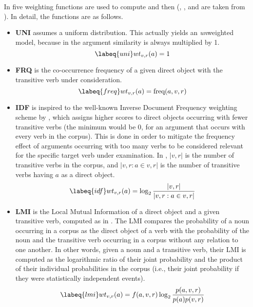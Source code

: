 In \textcite{CappelliLenciPISA} five weighting functions are used to compute  and then  (, , and  are taken from \textcite{ErkEtAl2010}). In detail, the functions are as follows.
\begin{itemize}

\item \textbf{UNI} assumes a uniform distribution. This actually yields an \textit{un}weighted model, because in  the argument similarity is always multiplied by 1.
\begin{equation} \labeq{uni}
wt_{v,r}(a) = 1
\end{equation}

\item \textbf{FRQ} is the co-occurrence frequency of a given direct object with the transitive verb under consideration.
\begin{equation} \labeq{freq}
wt_{v,r}(a) = \textrm{freq}(a,v,r)
\end{equation}

\item \textbf{IDF} is inspired to the well-known Inverse Document Frequency weighting scheme by \textcite{jones1973index}, which
assigns higher scores to direct objects occurring with fewer transitive verbs (the minimum would be 0, for an argument that occurs with every verb in the corpus). This is done in order to mitigate the frequency effect of arguments occurring with too many verbs to be considered relevant for the specific target verb under examination. In , $|v,r|$ is the number of transitive verbs in the corpus, and $|v,r : a \in v,r|$ is the number of transitive verbs having $a$ as a direct object.
 \begin{equation} \labeq{idf}
wt_{v,r}(a) = \log _{2} \frac{|v,r|}{|v,r : a \in v,r|}
\end{equation}

\item \textbf{LMI} is the Local Mutual Information \parencite[89]{evert2005statistics-lmi} of a direct object and a given transitive verb, computed as in . The LMI compares the probability of a noun occurring in a corpus as the direct object of a verb with the probability of the noun and the transitive verb occurring in a corpus without any relation to one another. In other words, given a noun and a transitive verb, their LMI is computed as the logarithmic ratio of their joint probability and the product of their individual probabilities in the corpus (i.e., their joint probability if they were statistically independent events).
 \begin{equation} \labeq{lmi}
wt_{v,r}(a) = f(a,v,r) \log _{2} \frac{p(a,v,r)}{p(a)p(v,r)}
\end{equation}  


\end{itemize}

